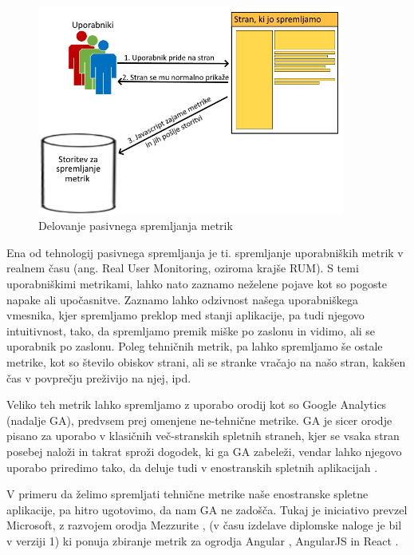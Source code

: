 \documentclass[a4paper, 12pt]{book}
\begin{document}
\begin{figure}[h]
	\begin{center}
		\includegraphics[width=0.9\textwidth]{rum_diagram.png}
	\end{center}
	\caption{Delovanje pasivnega spremljanja metrik}
	\label{img:rum}
\end{figure}

Ena od tehnologij pasivnega spremljanja je ti. spremljanje uporabniških metrik v realnem času (ang. Real User Monitoring, oziroma krajše RUM). S temi uporabniškimi metrikami, lahko nato zaznamo neželene pojave kot so pogoste napake ali upočasnitve. Zaznamo lahko odzivnost našega uporabniškega vmesnika, kjer spremljamo preklop med stanji aplikacije, pa tudi njegovo intuitivnost, tako, da spremljamo premik miške po zaslonu in vidimo, ali se uporabnik  po zaslonu. Poleg tehničnih metrik, pa lahko spremljamo še ostale metrike, kot so število obiskov strani, ali se stranke vračajo na našo stran, kakšen čas v povprečju preživijo na njej, ipd.

Veliko teh metrik lahko spremljamo z uporabo orodij kot so Google Analytics \cite{ga_website} (nadalje GA), predvsem prej omenjene ne-tehnične metrike. GA je sicer orodje pisano za uporabo v klasičnih več-stranskih spletnih straneh, kjer se vsaka stran posebej naloži in takrat sproži dogodek, ki ga GA zabeleži, vendar lahko njegovo uporabo priredimo tako, da deluje tudi v enostranskih spletnih aplikacijah \cite{ga_spa}.

V primeru da želimo spremljati tehnične metrike naše enostranske spletne aplikacije, pa hitro ugotovimo, da nam GA ne zadošča. Tukaj je iniciativo prevzel Microsoft, z razvojem orodja Mezzurite \cite{mezzurite_website}, (v času izdelave diplomske naloge je bil v verziji 1) ki ponuja zbiranje metrik za ogrodja Angular \cite{angular_website}, AngularJS \cite{angularjs_website} in React \cite{react_website}.
\end{document}
